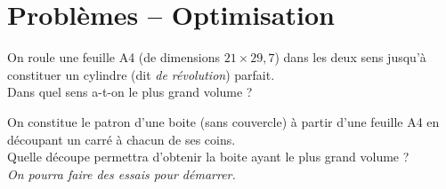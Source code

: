 



\fancyhead{} %

\fancyhead{} %





\chapter{Probl\`emes -- Optimisation}


 \setcounter{page}{1}

\begin{prob}
 On roule une feuille A4 (de dimensions $21\times 29,7$) dans les deux sens jusqu'\`a constituer un cylindre (dit \emph{de r\'evolution}) parfait.\\
 Dans quel sens a-t-on le plus grand volume ?
\end{prob}

\begin{prob}
 On constitue le patron d'une boite (sans couvercle) \`a partir d'une feuille A4 en d\'ecoupant un carr\'e \`a chacun de ses coins.\\
 Quelle d\'ecoupe permettra d'obtenir la boite ayant le plus grand volume ?\\
 \emph{On pourra faire des essais pour d\'emarrer.}
\end{prob}

